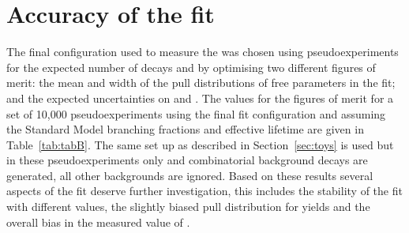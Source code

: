\section{Accuracy of the fit}
\label{sec:fitaccuracy}
The final configuration used to measure the \el was chosen using pseudoexperiments for the expected number of decays and by optimising two different figures of merit: the mean and width of the pull distributions of free parameters in the fit; and the expected uncertainties on \tmumu and \Gmumu. The values for the figures of merit for a set of 10,000 pseudoexperiments using the final fit configuration and assuming the Standard Model \bmumu branching fractions and effective lifetime are given in Table~\ref{tab:tabB}. The same set up as described in Section~\ref{sec:toys} is used but in these pseudoexperiments only \bsmumu and combinatorial background decays are generated, all other backgrounds are ignored. 
Based on these results several aspects of the fit deserve further investigation, this includes the stability of the fit with different \tmumu values, the slightly biased pull distribution for \bsmumu yields and the overall bias in the measured value of \tmumu. 

